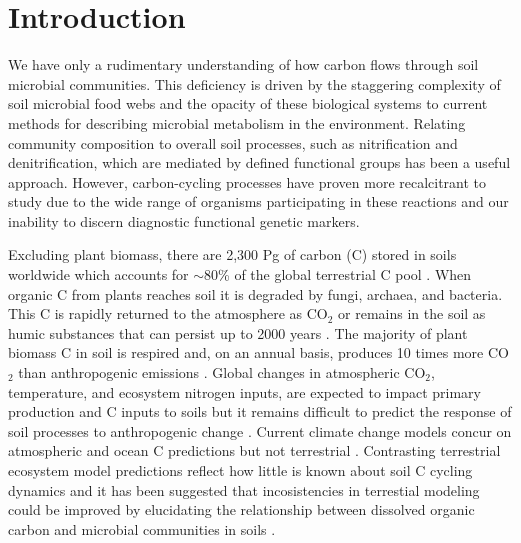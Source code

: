 \section{Introduction}
We have only a rudimentary understanding of how carbon flows through soil microbial communities. This deficiency is driven by the staggering complexity of soil microbial food webs and the opacity of these biological systems to current methods for describing microbial metabolism in the environment. Relating community composition to overall soil processes, such as nitrification and denitrification, which are mediated by defined functional groups has been a useful approach. However, carbon-cycling processes have proven more recalcitrant to study due to the wide range of organisms participating in these reactions and our inability to discern diagnostic functional genetic markers.
 
Excluding plant biomass, there are 2,300 Pg of carbon (C) stored in soils worldwide which accounts for $\sim$80\% of the global terrestrial C pool \cite{Amundson_2001,BATJES_1996}. When organic C from plants reaches soil it is degraded by fungi, archaea, and bacteria. This C is rapidly returned to the atmosphere as CO$_{2}$ or remains in the soil as humic substances that can persist up to 2000 years \cite{yanagita1990natural}. The majority of plant biomass C in soil is respired and, on an annual basis, produces 10 times more CO$_{2}$ than anthropogenic emissions \cite{chapin2002principles}. Global changes in atmospheric CO$_{2}$, temperature, and ecosystem nitrogen inputs, are expected to impact primary production and C inputs to soils \cite{Groenigen_2006} but it remains difficult to predict the response of soil processes to anthropogenic change \cite{DAVIDSON_2006}. Current climate change models concur on atmospheric and ocean C predictions but not terrestrial \cite{Friedlingstein_2006}. Contrasting terrestrial ecosystem model predictions reflect how little is known about soil C cycling dynamics and it has been suggested that incosistencies in terrestial modeling could be improved by elucidating the relationship between dissolved organic carbon and microbial communities in soils \cite{Neff_2001}. 

